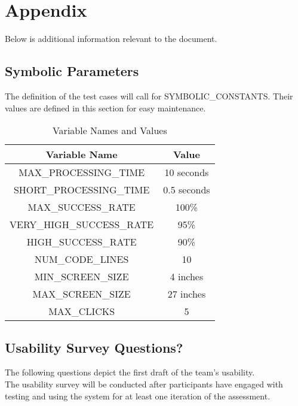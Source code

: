 \documentclass[12pt, titlepage]{article}
\begin{document}
				


\newpage


\newpage

\section{Appendix}

Below is additional information relevant to the document.

\subsection{Symbolic Parameters}

The definition of the test cases will call for SYMBOLIC\_CONSTANTS.
Their values are defined in this section for easy maintenance.

\begin{table}[h!]
  \centering
  \begin{tabular}{|c|c|}
      \hline
      \textbf{Variable Name} & \textbf{Value} \\
      \hline
      MAX\_PROCESSING\_TIME & 10 seconds \\
      \hline
      SHORT\_PROCESSING\_TIME & 0.5 seconds \\
      \hline
      MAX\_SUCCESS\_RATE & 100\% \\
      \hline
      VERY\_HIGH\_SUCCESS\_RATE & 95\% \\
      \hline
      HIGH\_SUCCESS\_RATE & 90\% \\
      \hline
      NUM\_CODE\_LINES & 10 \\
      \hline
      MIN\_SCREEN\_SIZE & 4 inches \\
      \hline
      MAX\_SCREEN\_SIZE & 27 inches \\
      \hline
      MAX\_CLICKS & 5 \\
      \hline
  \end{tabular}
  \caption{Variable Names and Values}
  \label{tab:variables}
\end{table}

\subsection{Usability Survey Questions?}
The following questions depict the first draft of the team's usability.\\
The usability survey will be conducted after participants have engaged with testing and using the system for at least one iteration of the assessment.\\
\end{document}
